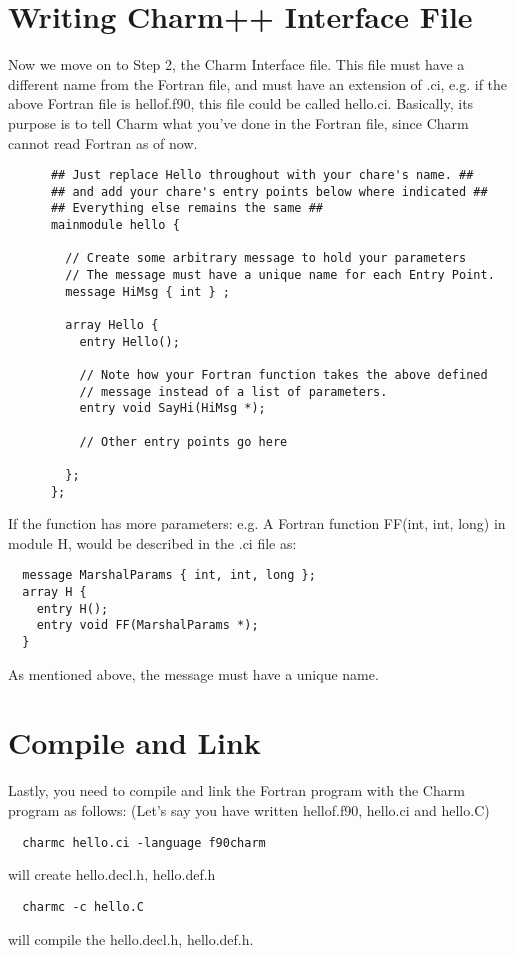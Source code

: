 \documentclass[11pt]{article}
\begin{document}
\section{Writing Charm++ Interface File}
Now we move on to Step 2, the Charm Interface file.  This file must
have a different name from the Fortran file, and must have an
extension of .ci, e.g. if the above Fortran file is hellof.f90, this
file could be called hello.ci.  Basically, its purpose is to tell
Charm what you've done in the Fortran file, since Charm cannot read
Fortran as of now.
\begin{verbatim}
      ## Just replace Hello throughout with your chare's name. ##
      ## and add your chare's entry points below where indicated ##
      ## Everything else remains the same ##
      mainmodule hello {
      
        // Create some arbitrary message to hold your parameters
        // The message must have a unique name for each Entry Point.
        message HiMsg { int } ;
      
        array Hello {
          entry Hello();

          // Note how your Fortran function takes the above defined
          // message instead of a list of parameters.
          entry void SayHi(HiMsg *);

          // Other entry points go here

        };              
      };
\end{verbatim}
If the function has more parameters: e.g. A Fortran function FF(int,
int, long) in module H, would be described in the .ci file as:
\begin{verbatim}
  message MarshalParams { int, int, long };
  array H {
    entry H();
    entry void FF(MarshalParams *);
  }
\end{verbatim}
As mentioned above, the message must have a unique name.

\section{Compile and Link}
Lastly, you need to compile and link the Fortran program with the
Charm program as follows: (Let's say you have written hellof.f90, 
hello.ci and hello.C)
\begin{verbatim}
  charmc hello.ci -language f90charm
\end{verbatim}
    will create hello.decl.h, hello.def.h

\begin{verbatim}
  charmc -c hello.C
\end{verbatim}
    will compile the hello.decl.h, hello.def.h.
\end{document}
